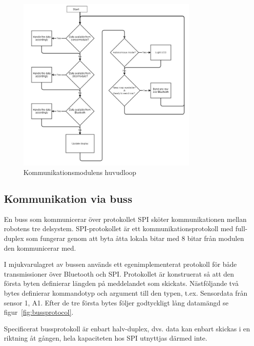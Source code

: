 \documentclass[a4paper,12pt,fleqn]{article}
\begin{document}
\begin{figure}[htp] %
  \begin{center}
  \includegraphics[keepaspectratio=true,width=0.8\textwidth]{bilder/mainmaster.jpg}  %
  \end{center}
  \caption{Kommunikationsmodulens huvudloop} %
  \label{fig:mainmaster}
\end{figure}


\subsection{Kommunikation via buss}
\label{chap:buss}
En buss som kommunicerar över protokollet SPI sköter kommunikationen mellan robotens tre delsystem. SPI-protokollet är ett kommunikationsprotokoll med full-duplex som fungerar genom att byta åtta lokala bitar med 8 bitar från modulen den kommunicerar med. 

I mjukvarulagret av bussen används ett egenimplementerat protokoll för både transmissioner över Bluetooth och SPI. Protokollet är konstruerat så att den första byten definierar längden på meddelandet som skickats. Nästföljande två bytes definierar kommandotyp och argument till den typen, t.ex. Sensordata från sensor 1, A1.
Efter de tre första bytes följer godtyckligt lång datamängd se figur~\ref{fig:bussprotocol}. 

Specificerat bussprotokoll är enbart halv-duplex, dvs. data kan enbart skickas i en riktning åt gången, hela kapaciteten hos SPI utnyttjas därmed inte. 
\end{document}
